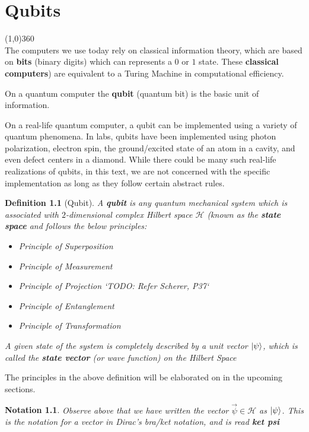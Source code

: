 \documentclass[12pt,twoside]{report}
\newtheorem{defn}[subsection]{Definition}
\newtheorem{notation}[subsection]{Notation}
\begin{document}
\chapter{Qubits}
\line(1,0){360} \\

The computers we use today rely on classical information theory, which are based on \textbf{bits} (binary digits) which can represents a $0$ or $1$ state. These \textbf{classical computers}) are equivalent to a Turing Machine in computational efficiency. 

On a quantum computer the \textbf{qubit} (quantum bit) is the basic unit of information.

On a real-life quantum computer, a qubit can be implemented using a variety of quantum phenomena. In labs, qubits have been implemented using photon polarization, electron spin, the ground/excited state of an atom in a cavity, and even defect centers in a diamond. While there could be many such real-life realizations of qubits, in this text, we are not concerned with the specific implementation as long as they follow certain abstract rules.

\begin{samepage}
\begin{defn}[Qubit]
A \textbf{qubit} is any quantum mechanical system which is associated with $2$-dimensional complex Hilbert space $\mathcal{H}$ (known as the \textbf{state space} and follows the below principles:
\begin{itemize}
    \item Principle of Superposition
    \item Principle of Measurement
    \item Principle of Projection `TODO: Refer Scherer, P37`
    \item Principle of Entanglement
    \item Principle of Transformation
\end{itemize}
 A given state of the system is completely described by a
 \textit{unit vector} $\ket{\psi}$, which is called the \textbf{state vector} (or wave function) on the Hilbert Space
\end{defn}
The principles in the above definition will be elaborated on in the upcoming sections.
\end{samepage}

\begin{notation}
    Observe above that we have written the vector $\vec{\psi} \in \mathcal{H}$ as $\ket{\psi}$. This is the notation for a vector in \textnormal{Dirac's bra/ket notation}, and is read \textbf{ket psi}
\end{notation}
\end{document}
